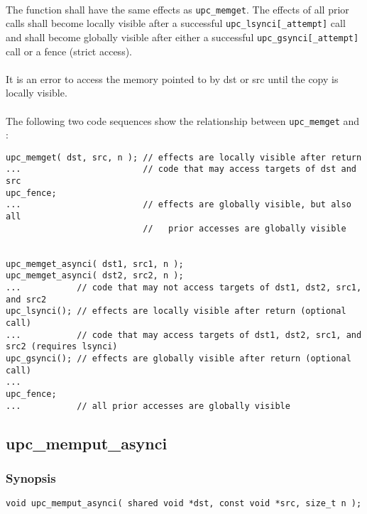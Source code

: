 \documentclass[10pt]{article}
\def \memget  {{\tt upc\_memget}}
\def \gsynci {{\tt upc\_gsynci[\_attempt]}}
\def \lsynci {{\tt upc\_lsynci[\_attempt]}}
\begin{document}
\paragraph{} The \function{} function shall have the same effects as \memget{}.
The effects of all prior \function{} calls shall become locally visible after a
successful \lsynci{} call and shall become globally visible after either a
successful \gsynci{} call or a fence (strict access).

\paragraph{} It is an error to access the memory pointed to by dst or src until
the copy is locally visible.

\paragraph{} The following two code sequences show the relationship between
\memget{} and \function{}:

\begin{verbatim}
upc_memget( dst, src, n ); // effects are locally visible after return
...                        // code that may access targets of dst and src
upc_fence;                 
...                        // effects are globally visible, but also all
                           //   prior accesses are globally visible


upc_memget_asynci( dst1, src1, n );
upc_memget_asynci( dst2, src2, n );
...           // code that may not access targets of dst1, dst2, src1, and src2
upc_lsynci(); // effects are locally visible after return (optional call)
...           // code that may access targets of dst1, dst2, src1, and src2 (requires lsynci)
upc_gsynci(); // effects are globally visible after return (optional call)
...
upc_fence;
...           // all prior accesses are globally visible
\end{verbatim}

\newpage
\subsection{upc\_memput\_asynci}
\def\function{{\tt upc\_memput\_asynci}}

\subsubsection{Synopsis}

\begin{verbatim}
void upc_memput_asynci( shared void *dst, const void *src, size_t n );
\end{verbatim}
\end{document}

